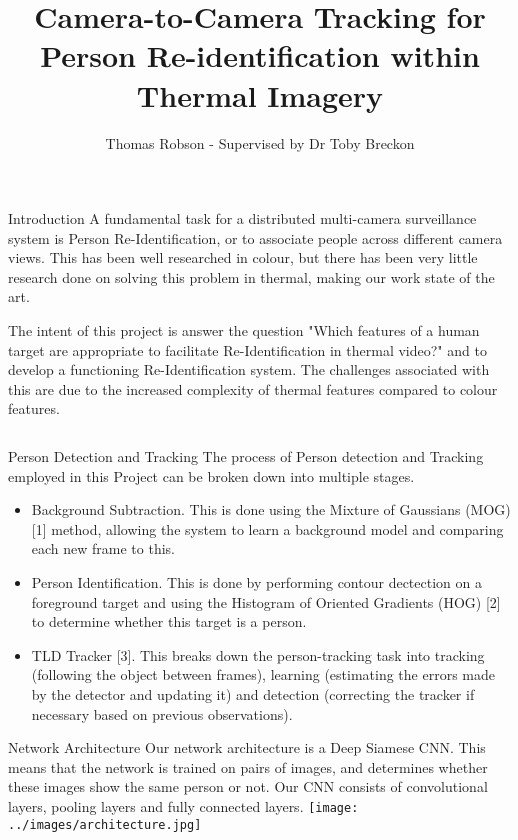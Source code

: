 \documentclass[final]{beamer}
\title[Thermal Re-ID]{Camera-to-Camera Tracking for Person Re-identification within Thermal Imagery}
\author[G Ingram]{Thomas Robson - Supervised by Dr Toby Breckon}
\institute[Durham]{School of Computer Science, Durham University}
\begin{document}
  \begin{frame}{} 

  \vfill
  \begin{block}{Introduction}
          A fundamental task for a distributed multi-camera surveillance system is Person Re-Identification, or to associate people across different camera views. This has been well researched in colour, but there has been very little research done on solving this problem in thermal, making our work state of the art. 

The intent of this project is answer the question "Which features of a human target are appropriate to facilitate Re-Identification in thermal video?" and to develop a functioning Re-Identification system. The challenges associated with this are due to the increased complexity of thermal features compared to colour features.
        \end{block}
        
    \begin{columns}[t]
      \begin{column}{.49\linewidth}
        
        \begin{block}{Person Detection and Tracking}
        	The process of Person detection and Tracking employed in this Project can be broken down into multiple stages. 
        	\begin{itemize}
        	\item Background Subtraction. This is done using the Mixture of Gaussians (MOG) [1] method, allowing the system to learn a background model and comparing each new frame to this. 

        	\item Person Identification. This is done by performing contour dectection on a foreground target and using the Histogram of Oriented Gradients (HOG) [2] to determine whether this target is a person.
        	
        	\item TLD Tracker [3]. This breaks down the person-tracking task into tracking (following the object between frames), learning (estimating the errors made by the detector and updating it) and detection (correcting the tracker if necessary based on previous observations). 
          \end{itemize}
        \end{block}
       


        \begin{block}{Network Architecture}
        Our network architecture is a Deep Siamese CNN. This means that the network is trained on pairs of images, and determines whether these images show the same person or not. Our CNN consists of convolutional layers, pooling layers and fully connected layers. 
        \texttt{[image: ../images/architecture.jpg]}
        \end{block}
	

\end{column}
\end{columns}
\end{frame}
\end{document}
